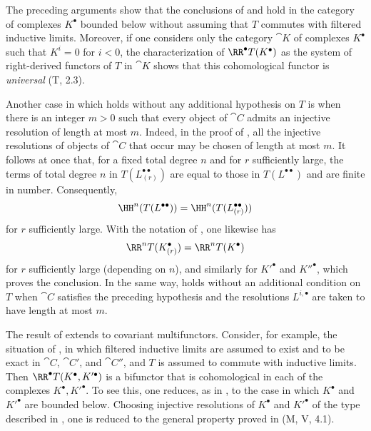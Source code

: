 \begin{remark}[11.5.4]
\label{0.11.5.4}
The preceding arguments show that the conclusions of  and  hold in the category of complexes $K^\bullet$ bounded below without assuming that $T$ commutes with filtered inductive limits.
Moreover, if one considers only the category $\cat{K}$ of complexes $K^\bullet$ such that $K^i=0$ for $i<0$, the characterization of $\RR^\bullet T(K^\bullet)$ as the system of right-derived functors of $T$ in $\cat{K}$ shows that this cohomological functor is \emph{universal} (T, 2.3).

Another case in which  holds without any additional hypothesis on $T$ is when there is an integer $m>0$ such that every object of $\cat{C}$ admits an injective resolution of length at most $m$.
Indeed, in the proof of , all the injective resolutions of objects of $\cat{C}$ that occur may be chosen of length at most $m$.
It follows at once that, for a fixed total degree $n$ and for $r$ sufficiently large, the terms of total degree $n$ in $T(L^{\bullet\bullet}_{(r)})$ are equal to those in $T(L^{\bullet\bullet})$ and are finite in number.
Consequently,
\[
  \HH^n(T(L^{\bullet\bullet}))
  =\HH^n(T(L^{\bullet\bullet}_{(r)}))
\]
for $r$ sufficiently large.
With the notation of , one likewise has
\[
  \RR^nT(K^\bullet_{(r)})=\RR^nT(K^\bullet)
\]
for $r$ sufficiently large (depending on $n$), and similarly for $K'^\bullet$ and $K''^\bullet$, which proves the conclusion.
In the same way,  holds without an additional condition on $T$ when $\cat{C}$ satisfies the preceding hypothesis and the resolutions $L^{i,\bullet}$ are taken to have length at most $m$.
\end{remark}

\begin{env}[11.5.5]
\label{0.11.5.5}
The result of  extends to covariant multifunctors.
Consider, for example, the situation of , in which filtered inductive limits are assumed to exist and to be exact in $\cat{C}$, $\cat{C}'$, and $\cat{C}''$,
and $T$ is assumed to commute with inductive limits.
Then $\RR^\bullet T(K^\bullet,K'^\bullet)$ is a bifunctor that is cohomological in each of the complexes $K^\bullet,K'^\bullet$.
To see this, one reduces, as in , to the case in which $K^\bullet$ and $K'^\bullet$ are bounded below.
Choosing injective resolutions of $K^\bullet$ and $K'^\bullet$ of the type described in , one is reduced to the general property proved in (M, V, 4.1).
\end{env}

